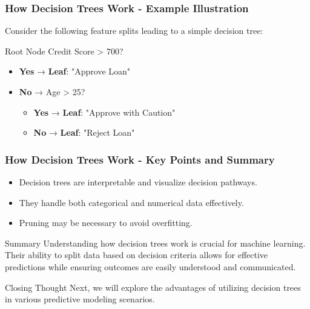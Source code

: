 \documentclass[aspectratio=169]{beamer}
\begin{document}
\begin{frame}[fragile]
    \frametitle{How Decision Trees Work - Example Illustration}
    Consider the following feature splits leading to a simple decision tree:
    
    \begin{block}{Root Node}
        Credit Score > 700?
        \begin{itemize}
            \item \textbf{Yes} → \textbf{Leaf}: "Approve Loan"
            \item \textbf{No} → Age > 25?
                \begin{itemize}
                    \item \textbf{Yes} → \textbf{Leaf}: "Approve with Caution"
                    \item \textbf{No} → \textbf{Leaf}: "Reject Loan"
                \end{itemize}
        \end{itemize}
    \end{block}
\end{frame}

\begin{frame}[fragile]
    \frametitle{How Decision Trees Work - Key Points and Summary}
    \begin{itemize}
        \item Decision trees are interpretable and visualize decision pathways.
        \item They handle both categorical and numerical data effectively.
        \item Pruning may be necessary to avoid overfitting.
    \end{itemize}
    
    \begin{block}{Summary}
        Understanding how decision trees work is crucial for machine learning. Their ability to split data based on decision criteria allows for effective predictions while ensuring outcomes are easily understood and communicated.
    \end{block}
    
    \begin{block}{Closing Thought}
        Next, we will explore the advantages of utilizing decision trees in various predictive modeling scenarios.
    \end{block}
\end{frame}
\end{document}
